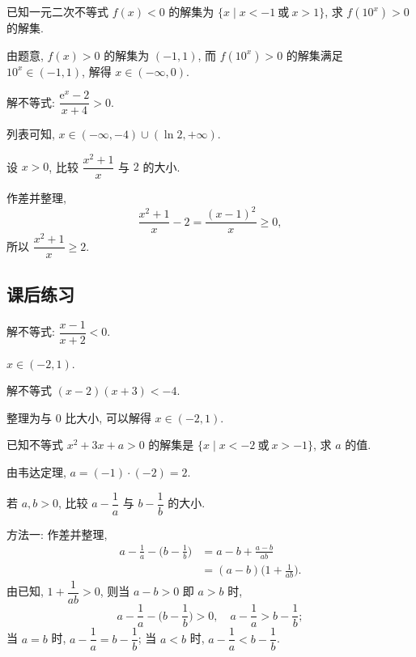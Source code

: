 \begin{exercise}
    已知一元二次不等式 $f(x)<0$ 的解集为 $\{x\mid x<-1\ \text{或}\ x> 1\}$, 求 $f(10^x)>0$ 的解集.
\end{exercise}
\beginsolution
    由题意, $f(x)>0$ 的解集为 $(-1,1)$, 而 $f(10^x)>0$ 的解集满足 $10^x\in (-1,1)$, 解得 $x\in (-\infty,0)$.
\endsolution

\begin{exercise}
    解不等式: $\dfrac{\mathrm{e}^x-2}{x+4}>0$.
\end{exercise}
\beginsolution
    列表可知, $x\in (-\infty,-4)\cup (\ln 2,+\infty)$.
\endsolution

\begin{exercise}
    设 $x>0$, 比较 $\dfrac{x^2+1}x$ 与 $2$ 的大小.
\end{exercise}
\beginsolution
    作差并整理,
    \[\frac{x^2+1}x- 2= \frac{(x-1)^2}{x}\geqslant 0,\]
    所以 $\dfrac{x^2+1}x\geqslant 2$.
\endsolution

\subsection{课后练习}
\begin{exercise}
    解不等式: $\dfrac{x-1}{x+2}<0$.
\end{exercise}
\beginsolution
    $x\in (-2,1)$.
\endsolution

\begin{exercise}
    解不等式 $(x-2)(x+3)< -4$.
\end{exercise}
\beginsolution
    整理为与 $0$ 比大小, 可以解得 $x\in (-2,1)$.
\endsolution

\begin{exercise}
    已知不等式 $x^2 +3x+a>0$ 的解集是 $\{x\mid x<-2\ \text{或}\ x>-1\}$, 求 $a$ 的值.
\end{exercise}
\beginsolution
    由韦达定理, $a= (-1)\cdot (-2)= 2$.
\endsolution

\begin{exercise}
    若 $a,b>0$, 比较 $a-\dfrac1a$ 与 $b-\dfrac1b$ 的大小.
\end{exercise}
\beginsolution
    方法一: 作差并整理,
    \[\begin{aligned}
        a-\frac1a- \biggl(b-\frac1b\biggl)
        &= a-b+ \frac{a-b}{ab}\\
        &= (a-b)\biggl(1+\frac1{ab}\biggr).
    \end{aligned}\]
    由已知, $1+\dfrac1{ab}>0$, 则当 $a-b>0$ 即 $a>b$ 时,
    \[a-\frac1a- \biggl(b-\frac1b\biggl)>0,\quad
    a-\frac1a> b-\frac1b;\]
    当 $a=b$ 时, $a-\dfrac1a= b-\dfrac1b$; 当 $a<b$ 时, $a-\dfrac1a< b-\dfrac1b$.

